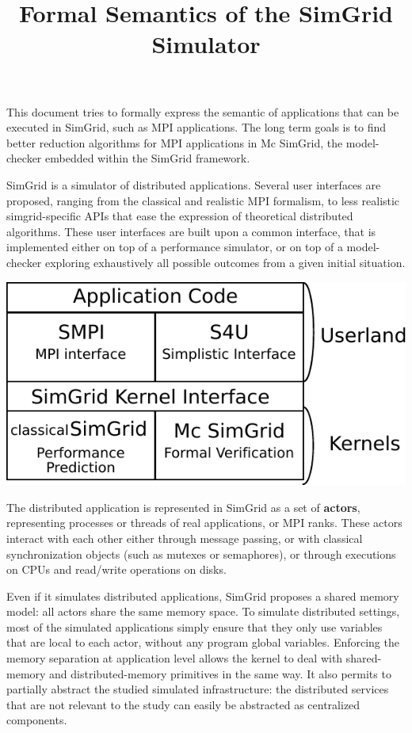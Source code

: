 \documentclass[a4paper,11pt]{article}
\title{Formal Semantics of the SimGrid Simulator}
\begin{document}
\maketitle

This document tries to formally express the semantic of applications that can be executed in SimGrid, such as MPI applications. The long term goals is to find better reduction algorithms for MPI applications in Mc SimGrid, the model-checker embedded within the SimGrid framework.

\medskip

SimGrid is a simulator of distributed applications. Several user interfaces are proposed, ranging from the classical and realistic MPI formalism, to less realistic simgrid-specific APIs that ease the expression of theoretical distributed algorithms. These user interfaces are built upon a common interface, that is implemented either on top of a performance simulator, or on top of a model-checker exploring exhaustively all possible outcomes from a given initial situation.

\centerline{\includegraphics[scale=.6]{simgrid-architecture.pdf}}

The distributed application is represented in SimGrid as a set of \textbf{actors}, representing  
processes or threads of real applications, or MPI ranks. These actors  interact with each other either through message passing, or with classical synchronization objects (such as mutexes or semaphores), or through executions on CPUs and read/write  operations on disks.

Even if it simulates distributed applications, SimGrid proposes a shared memory model: all actors share the same memory space. To simulate distributed settings, most of the simulated applications simply ensure that they only use variables that are local to each actor, without any program global variables. Enforcing the memory separation at application level allows the kernel to deal with shared-memory and distributed-memory primitives in the same way. It also permits to partially abstract the studied simulated infrastructure: the distributed services that are not relevant to the study can easily be abstracted as centralized components.
\end{document}
